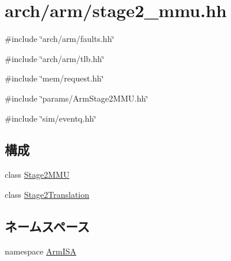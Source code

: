 \hypertarget{stage2__mmu_8hh}{
\section{arch/arm/stage2\_\-mmu.hh}
\label{stage2__mmu_8hh}
}
{\ttfamily \#include \char`\"{}arch/arm/faults.hh\char`\"{}}\par
{\ttfamily \#include \char`\"{}arch/arm/tlb.hh\char`\"{}}\par
{\ttfamily \#include \char`\"{}mem/request.hh\char`\"{}}\par
{\ttfamily \#include \char`\"{}params/ArmStage2MMU.hh\char`\"{}}\par
{\ttfamily \#include \char`\"{}sim/eventq.hh\char`\"{}}\par
\subsection*{構成}
\begin{DoxyCompactItemize}
\item 
class \hyperlink{classArmISA_1_1Stage2MMU}{Stage2MMU}
\item 
class \hyperlink{classArmISA_1_1Stage2MMU_1_1Stage2Translation}{Stage2Translation}
\end{DoxyCompactItemize}
\subsection*{ネームスペース}
\begin{DoxyCompactItemize}
\item 
namespace \hyperlink{namespaceArmISA}{ArmISA}
\end{DoxyCompactItemize}
